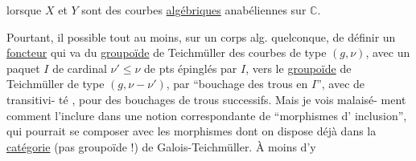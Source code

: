 lorsque $X$ et $Y$ sont des courbes \uline{algébriques}
anabéliennes sur $\mathbb C$.

Pourtant, il   possible tout au
moins, sur un corps alg.  quelconque,
de définir un \uline{foncteur} qui va du
\uline{groupoïde} de Teichmüller des
courbes de type $(g,\nu)$,  avec un
paquet  $I$ de cardinal $\nu'\leq\nu$ de
pts épinglés par $I$, vers le \uline{groupoïde}
de Teichmüller de type $(g,\nu-\nu')$,
par ``bouchage des trous en $I$'', 
avec   de transitivi-
té , pour des bouchages de
trous successifs. Mais je vois malaisé-
ment comment l'inclure dans une
notion correspondante de ``morphismes d'
inclusion'', qui pourrait se composer
avec les morphismes dont on dispose
déjà dans la \uline{catégorie} (pas groupoïde !)
de Galois-Teichmüller. À moins d'y
